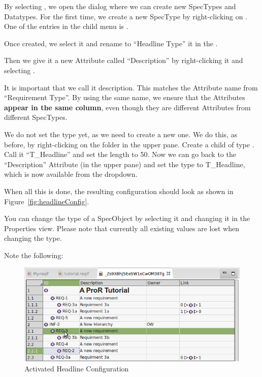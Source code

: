 By selecting , we open the dialog where we can create new SpecTypes and Datatypes.  For the first time, we create a new SpecType by right-clicking on .  One of the entries in the child menu is .

Once created, we select it and rename to ``Headline Type'' it in the .

Then we give it a new Attribute called ``Description'' by right-clicking it and selecting .

\begin{warning}
It is important that we call it description.  This matches the Attribute name from ``Requirement Type''.  By using the same name, we ensure that the Attributes \textbf{appear in the same column}, even though they are different Attributes from different SpecTypes.
\end{warning}

We do not set the type yet, as we need to create a new one.  We do this, as before, by right-clicking on the  folder in the upper pane.  Create a child of type .  Call it ``T\_Headline'' and set the length to 50.  Now we can go back to the ``Description'' Attribute (in the upper pane) and set the type to T\_Headline, which is now available from the dropdown.

When all this is done, the resulting configuration should look as shown in Figure~\ref{fig:headlineConfig}.

You can change the type of a SpecObject by selecting it and changing it in the Properties view.  Please note that currently all existing values are lost when changing the type.

Note the following:

\begin{figure}
\centering      
\includegraphics[width=0.8\linewidth]{../rmf-images/hierarchy_step_1}
\caption{Activated Headline Configuration}      
\label{fig:activeHeadlineConfig}
\end{figure}

